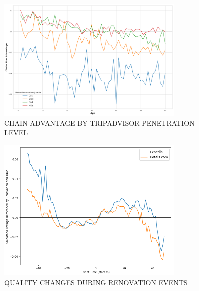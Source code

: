 \documentclass[mksc,blindrev]{informs3} %
\begin{document}
\begin{figure}[hp]
\caption{CHAIN ADVANTAGE BY TRIPADVISOR PENETRATION LEVEL}
 \label{fig:modelfree}
 \centering
 \includegraphics[width=0.8\textwidth,height=\textheight,keepaspectratio]{./Figures/model_free.png}
\end{figure}
\clearpage

\begin{figure}[hp]
\caption{QUALITY CHANGES DURING RENOVATION EVENTS}
 \label{fig:renovqual}
 \centering
 \includegraphics[width=0.8\textwidth,height=\textheight,keepaspectratio]{./Figures/Renovation_Event_dm_ym_event.png}
\end{figure}
\clearpage

\end{document}
